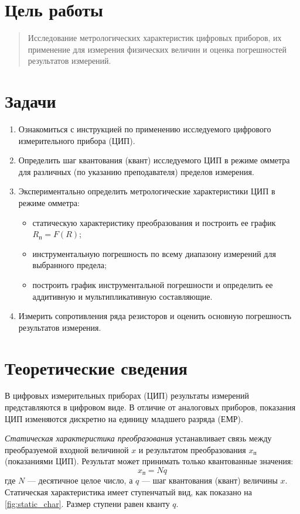 \section*{Цель работы}
\begin{quote}
    Исследование метрологических характеристик цифровых приборов, их применение для измерения физических величин и оценка погрешностей результатов измерений.
\end{quote}

\section*{Задачи}
\begin{enumerate}
    \item Ознакомиться с инструкцией по применению исследуемого цифрового измерительного прибора (ЦИП).
    \item Определить шаг квантования (квант) исследуемого ЦИП в режиме омметра для различных (по указанию преподавателя) пределов измерения.
    \item Экспериментально определить метрологические характеристики ЦИП в режиме омметра:
    \begin{itemize}
        \item статическую характеристику преобразования и построить ее график $R_\text{п} = F(R)$;
        \item инструментальную погрешность по всему диапазону измерений для выбранного предела;
        \item построить график инструментальной погрешности и определить ее аддитивную и мультипликативную составляющие.
    \end{itemize}
    \item Измерить сопротивления ряда резисторов и оценить основную погрешность результатов измерения.
\end{enumerate}

\section*{Теоретические сведения}
В цифровых измерительных приборах (ЦИП) результаты измерений представляются в цифровом виде. В отличие от аналоговых приборов, показания ЦИП изменяются дискретно на единицу младшего разряда (ЕМР).

\textit{Статическая характеристика преобразования} устанавливает связь между преобразуемой входной величиной $x$ и результатом преобразования $x_\text{п}$ (показаниями ЦИП). Результат может принимать только квантованные значения:
\begin{equation*}
    x_\text{п} = Nq
\end{equation*}
где $N$ — десятичное целое число, а $q$ — шаг квантования (квант) величины $x$. Статическая характеристика имеет ступенчатый вид, как показано на \cref{fig:static_char}. Размер ступени равен кванту $q$.

